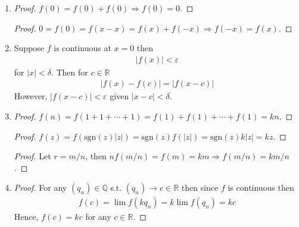 \begin{enumerate}[label=(\alph*)]
    \item 
    \begin{proof}
        $f(0) = f(0)+f(0) \Rightarrow f(0)=0$.
    \end{proof}

    \begin{proof}
        $0=f(0)=f(x-x)=f(x)+f(-x) \Rightarrow f(-x)=f(x)$.
    \end{proof}

    \item
    Suppose $f$ is continuous at $x=0$ then 
    \begin{align*}
        |f(x)|< \varepsilon
    \end{align*}
    for $|x|<\delta$. Then for $c\in \mathbb{R}$
    \begin{align*}
        |f(x)-f(c)| = |f(x-c)|
    \end{align*}
    However, $|f(x-c)|<\varepsilon$ given $|x-c|<\delta$.

    \item
    \begin{proof}
        $f(n) = f(1+1+\cdots+1) = f(1)+f(1)+\cdots+f(1) = kn$.
    \end{proof}

    \begin{proof}
        $f(z) = f(\text{sgn}(z)|z|) = \text{sgn}(z)f(|z|) = \text{sgn}(z)k|z| = kz$.
    \end{proof}

    \begin{proof}
        Let $r=m/n$, then $nf(m/n)=f(m)=km \Rightarrow f(m/n)=km/n$.
    \end{proof}

    \item
    \begin{proof}
        For any $(q_n)\in \mathbb{Q}$ s.t. $(q_n) \rightarrow c \in \mathbb{R}$ then 
        since $f$ is continuous then 
        \begin{align*}
            f(c) = \lim f(kq_n) = k \lim f(q_n) = kc
        \end{align*}
        Hence, $f(c)=kc$ for any $c\in \mathbb{R}$.
    \end{proof}
\end{enumerate}

